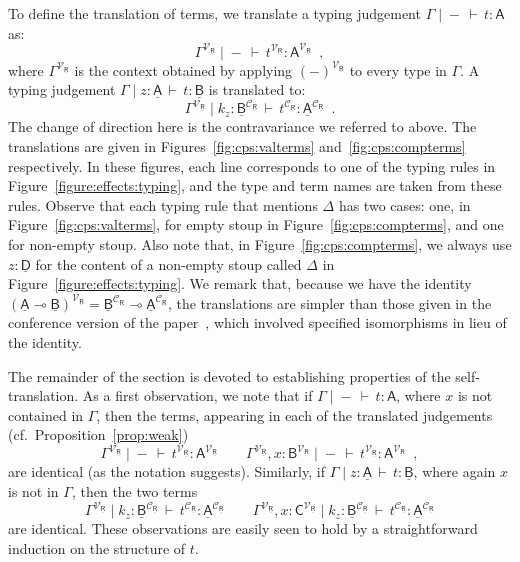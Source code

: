 \documentclass{LMCS}
\newcommand{\comptype}[1]{\underline{#1}}
\newcommand{\VA}{\mathsf{A}}
\newcommand{\VB}{\mathsf{B}}
\newcommand{\VC}{\mathsf{C}}
\newcommand{\CA}{\comptype{\mathsf{A}}}
\newcommand{\CB}{\comptype{\mathsf{B}}}
\newcommand{\CD}{\comptype{\mathsf{D}}}
\newcommand{\CR}{\comptype{\mathsf{R}}}
\newcommand{\lpop}{\multimap}
\newcommand{\In}[2]{#1 \colon  \! #2}
\newcommand{\rIn}[2]{#1 \colon  #2}
\newcommand{\Cj}[4]{#1 \mid  \! #2 \, \vdash \, \rIn{#3}{#4}}
\newcommand{\Vj}[3]{\Cj{#1}{{-}}{#2}{#3}}
\newcommand{\CpsVT}[1]{#1^{\mathcal{V}_{\CR}}}
\newcommand{\CpsCT}[1]{#1^{\mathcal{C}_{\CR}}}
\begin{document}
To define the translation of  terms, we translate a typing judgement 
$\Vj{\Gamma}{t}{\VA}$ as:
\[
\Vj{\CpsVT{\Gamma}}{\CpsVT{t}}{\CpsVT{\VA}} \enspace ,
\]
where $\CpsVT{\Gamma}$ is the context obtained by applying $\CpsVT{(-)}$ to every type in $\Gamma$. 
A typing judgement $\Cj{\Gamma}{\In{z}{\CA}}{t}{\CB}$ is translated to:
\[
\Cj{\CpsVT{\Gamma}}{\In{k_z}{\CpsCT{\CB}}}{\CpsCT{t}}{\CpsCT{\CA}} \enspace .
\]
The change of direction here is the contravariance we referred to above.
The translations are given in Figures~\ref{fig:cps:valterms} 
and~\ref{fig:cps:compterms} respectively.
In these figures, 
each line corresponds to one of the typing rules
in Figure~\ref{figure:effects:typing}, and the type 
and term names are taken from these rules. 
Observe that each typing rule that mentions $\Delta$ 
has two cases:  one, in Figure~\ref{fig:cps:valterms},
for  empty stoup in Figure~\ref{fig:cps:compterms}, and one 
for non-empty stoup.
Also note that, in Figure~\ref{fig:cps:compterms},
we always use $\In{z}{\CD}$ for the content of a non-empty stoup called $\Delta$ in 
Figure~\ref{figure:effects:typing}. We remark that,
because we have the identity $\CpsVT{(\CA \lpop \CB)} = \CpsCT{\CB} \lpop \CpsCT{\CA}$,
the translations are simpler than those
given in the conference version of the paper~\cite{EMS:fossacs}, which involved
specified isomorphisms in lieu of the identity.


The remainder of the section is devoted to establishing properties of the self-translation.
As a first observation, we note that if $\Vj{\Gamma}{t}{\VA}$, where $x$ is not
contained in $\Gamma$, then the terms, appearing in each of the translated judgements
(cf.\ Proposition~\ref{prop:weak})
\[
\Vj{\CpsVT{\Gamma}}{\CpsVT{t}}{\CpsVT{\VA}}
\qquad
\Vj{\CpsVT{\Gamma}, \In{x}{\CpsVT{\VB}}}{\CpsVT{t}}{\CpsVT{\VA}} \enspace ,
\]
are identical (as the notation suggests). Similarly, if
$\Cj{\Gamma}{\In{z}{\CA}}{t}{\CB}$, where again $x$ is not in $\Gamma$,
then the two terms
\[
\Cj{\CpsVT{\Gamma}}{\In{k_z}{\CpsCT{\CB}}}{\CpsCT{t}}{\CpsCT{\CA}} 
\qquad
\Cj{\CpsVT{\Gamma}, \In{x}{\CpsVT{\VC}}}{\In{k_z}{\CpsCT{\CB}}}{\CpsCT{t}}{\CpsCT{\CA}} 
\]
are identical. These observations are easily seen to hold by 
a straightforward induction on the structure of $t$.
\end{document}
